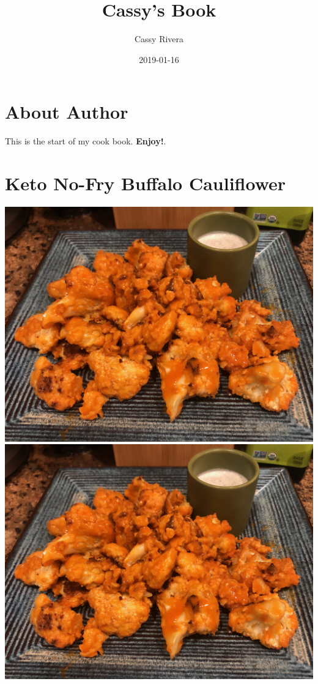 \documentclass[]{book}
\title{Cassy's Book}
\author{Cassy Rivera}
\date{2019-01-16}
\begin{document}
\maketitle

{
\setcounter{tocdepth}{1}
\tableofcontents
}
\chapter{About Author}\label{about-author}

This is the start of my cook book. \textbf{Enjoy!}.

\chapter{Keto No-Fry Buffalo Cauliflower}\label{intro}

\includegraphics{../food.jpeg} \includegraphics{../food.jpeg}
\end{document}
